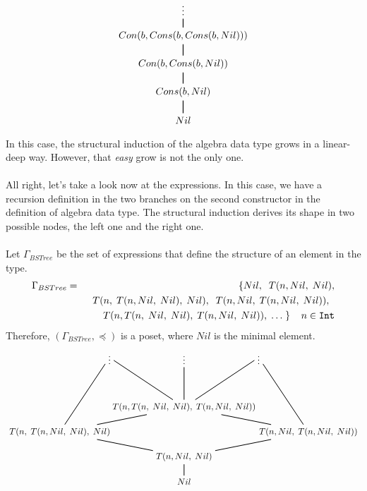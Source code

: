 \begin{align*}
	\begin{tikzpicture}                                   
	\node (a) at (0,3) {$\vdots$};                        
	\node (b) at (0,2) {$Con(b, Cons(b, Cons(b, Nil)))$}; 
	\node (c) at (0,1) {$Con(b, Cons(b, Nil))$};          
	\node (d) at (0,0) {$Cons(b, Nil)$};                  
	\node (min) at (0,-1) {$Nil$};                        
	\draw [thick](min) -- (d) -- (c) -- (b) -- (a);       
	\end{tikzpicture}                                     
\end{align*}
In this case, the structural induction of the  algebra data type grows in a linear-deep way. However, that \textit{easy} grow is not the only one.\\\\
All right, let's take a look now at the  expressions. In this case, we have a recursion definition in the two branches on the second constructor in the definition of  algebra data type. The structural induction derives its shape in two possible nodes, the left one and the right one.\\\\
Let $\Gamma_{BSTree}$ be the set of expressions that define the structure of an element in the  type.
\begin{eqnarray*}
	\Gamma_{BSTree} & = & \{ Nil, \;\; T(n, Nil, \; Nil), \\
	&& \;\; T(n, \; T(n, Nil, \; Nil), \; Nil), \;\; T(n, Nil, \; T(n, Nil, \; Nil)), \;\;  \\
	&& \;\; T(n, T(n, \; Nil, \; Nil), \; T(n, Nil, \; Nil)), \; \ldots \; \} \;\; \;\; n \in \texttt{Int}
\end{eqnarray*}
Therefore, $(\Gamma_{BSTree}, \preceq)$ is a poset, where $Nil$ is the minimal element.
\begin{align*}
	\begin{tikzpicture}                                                       
	\node (a3) at (3,4) {$\vdots$};                                           
	\node (a2) at (0,4) {$\vdots$};                                           
	\node (a1) at (-3,4) {$\vdots$};                                          
	\node (c2) at (0,2) {$T(n, T(n, \; Nil, \; Nil), \; T(n, Nil, \; Nil))$}; 
	\node (c3) at (5,1) {$T(n, Nil, \; T(n, Nil, \; Nil))$};                  
	\node (c1) at (-5,1) {$T(n, \; T(n, Nil, \; Nil), \; Nil)$};              
	\node (d) at (0,0) {$T(n, Nil, \; Nil)$};                                 
	\node (min) at (0,-1) {$Nil$};                                            
	\draw [thick](min) -- (d) -- (c1) -- (c2) -- (a2);                        
	\draw [thick](c1) -- (a1);                                                
	\draw [thick](c3) -- (a3);                                                
	\draw [thick](c2) -- (a3);                                                
	\draw [thick](d) -- (c3) -- (c2) -- (a1);                                 
	\end{tikzpicture}                                                         
\end{align*}
